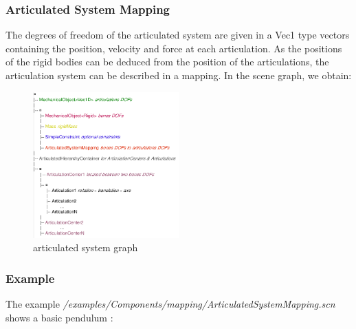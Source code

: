 \subsubsection{Articulated System Mapping}

The degrees of freedom of the articulated system are given in a Vec1 type vectors containing the position, velocity and force at each articulation.
As the positions of the rigid bodies can be deduced from the position of the articulations, the articulation system can be described in a mapping.
In the scene graph, we obtain:

\begin{figure}[htpb]
	\centering
		\includegraphics[width=0.5\textwidth]{articulatedsystem_graph}
	\caption{articulated system graph}
\end{figure}

\subsubsection {Example}

The example \textit{/examples/Components/mapping/ArticulatedSystemMapping.scn} shows a basic pendulum :

